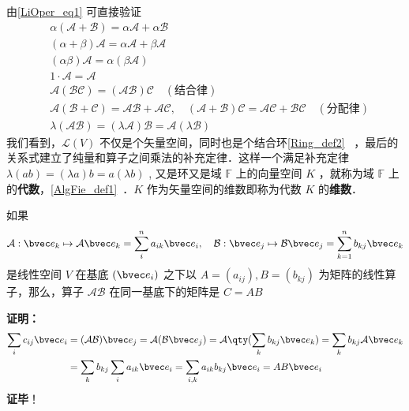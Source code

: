 由\autoref{LiOper_eq1} 可直接验证
\begin{equation}
\begin{aligned}
&\alpha(\mathcal{A+B})=\alpha\mathcal{A}+\alpha\mathcal{B}\\
&(\alpha+\beta)\mathcal{A}=\alpha\mathcal{A}+\beta\mathcal{A}\\
&(\alpha\beta)\mathcal{A}=\alpha(\beta\mathcal{A})\\
&1\cdot \mathcal{A}=\mathcal A\\
&\mathcal{A}(\mathcal{BC})=(\mathcal{AB})\mathcal C\quad(\text{结合律})\\
&\mathcal A(\mathcal{B+C})=\mathcal{AB+AC},\quad (\mathcal{A+B})\mathcal C=\mathcal{AC+BC}\quad(\text{分配律})\\
&\lambda(\mathcal{AB})=(\lambda\mathcal{A})\mathcal{B}=\mathcal{A}(\lambda \mathcal B)
\end{aligned}
\end{equation}
我们看到，$\mathcal{L}(V)$ 不仅是个矢量空间，同时也是个结合环\autoref{Ring_def2}~ ，最后的关系式建立了纯量和算子之间乘法的补充定律．这样一个满足补充定律 $\lambda(ab)=(\lambda a)b=a(\lambda b)$ , 又是环又是域 $\mathbb{F}$ 上的向量空间 $K$ ，就称为域 $\mathbb{F}$ 上的\textbf{代数}，\autoref{AlgFie_def1}~．$K$ 作为矢量空间的维数即称为代数 $K$ 的\textbf{维数}．

\begin{theorem}{}\label{LiOper_the1}
如果
\begin{equation}\label{LiOper_eq2}
\mathcal{A}:\bvec e_k\mapsto \mathcal{A}\bvec e_k=\sum_i^{n}a_{ik}\bvec e_i,\quad \mathcal{B}:\bvec e_j\mapsto  \mathcal{B}\bvec e_j=\sum_{k=1}^n b_{kj}\bvec e_k
\end{equation}
是线性空间 $V$ 在基底 $(\bvec e_i)$ 之下以 $A=(a_{ij}), B=(b_{kj})$ 为矩阵的线性算子，那么，算子 $\mathcal{AB}$ 在同一基底下的矩阵是 $C=AB$
\end{theorem}
\textbf{证明：}
\begin{equation}
\begin{aligned}
\sum_i c_{ij}\bvec e_i&=(\mathcal{AB})\bvec e_j=\mathcal{A}(\mathcal{B}\bvec e_j)=\mathcal{A}\qty(\sum_k b_{kj}\bvec e_k)=\sum_k b_{kj}\mathcal{A}\bvec e_k\\
&=\sum_k b_{kj}\sum_i a_{ik}\bvec e_i=\sum_{i,k}a_{ik}b_{kj}\bvec e_i=AB\bvec e_i
\end{aligned}
\end{equation}
\textbf{证毕}！
